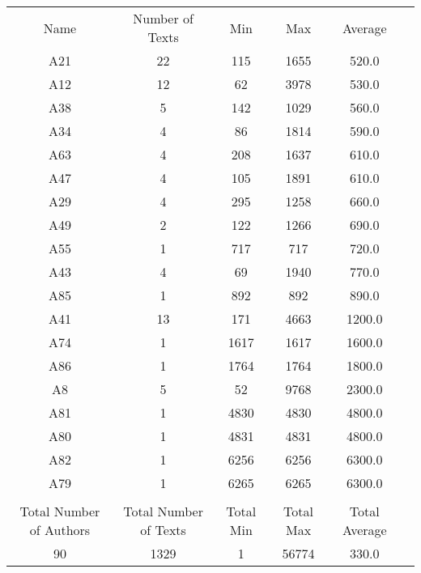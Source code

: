 \newpage
\begin{tabular}{cccccc}
Name & Number of Texts & Min & Max & Average\\
A21 & 22 & 115 & 1655 & 520.0\\
A12 & 12 & 62 & 3978 & 530.0\\
A38 & 5 & 142 & 1029 & 560.0\\
A34 & 4 & 86 & 1814 & 590.0\\
A63 & 4 & 208 & 1637 & 610.0\\
A47 & 4 & 105 & 1891 & 610.0\\
A29 & 4 & 295 & 1258 & 660.0\\
A49 & 2 & 122 & 1266 & 690.0\\
A55 & 1 & 717 & 717 & 720.0\\
A43 & 4 & 69 & 1940 & 770.0\\
A85 & 1 & 892 & 892 & 890.0\\
A41 & 13 & 171 & 4663 & 1200.0\\
A74 & 1 & 1617 & 1617 & 1600.0\\
A86 & 1 & 1764 & 1764 & 1800.0\\
A8 & 5 & 52 & 9768 & 2300.0\\
A81 & 1 & 4830 & 4830 & 4800.0\\
A80 & 1 & 4831 & 4831 & 4800.0\\
A82 & 1 & 6256 & 6256 & 6300.0\\
A79 & 1 & 6265 & 6265 & 6300.0\\
& & & & & \\ 
Total Number of Authors & Total Number of Texts & Total Min & Total Max & Total Average \\ 
90 & 1329 & 1 & 56774 & 330.0\\ 
\end{tabular}
